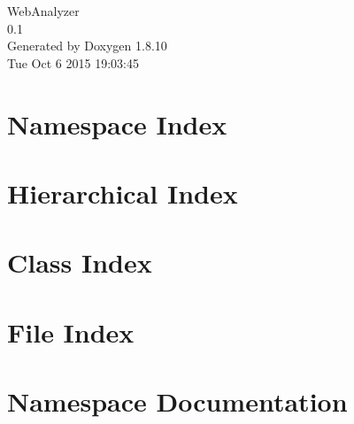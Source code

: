 \documentclass[twoside]{book}
\newcommand{\+}{\discretionary{\mbox{\scriptsize$\hookleftarrow$}}{}{}}
\newcommand{\clearemptydoublepage}{%
  \newpage{\pagestyle{empty}\cleardoublepage}%
}
\begin{document}
\hypersetup{pageanchor=false,
             bookmarks=true,
             bookmarksnumbered=true,
             pdfencoding=unicode
            }
\begin{titlepage}
\vspace*{7cm}
\begin{center}%
{\Large Web\+Analyzer \\[1ex]\large 0.\+1 }\\
\vspace*{1cm}
{\large Generated by Doxygen 1.8.10}\\
\vspace*{0.5cm}
{\small Tue Oct 6 2015 19:03:45}\\
\end{center}
\end{titlepage}
\clearemptydoublepage
\tableofcontents
\clearemptydoublepage
{}
\hypersetup{pageanchor=true}

\chapter{Namespace Index}

\chapter{Hierarchical Index}

\chapter{Class Index}

\chapter{File Index}

\chapter{Namespace Documentation}
























\end{document}
